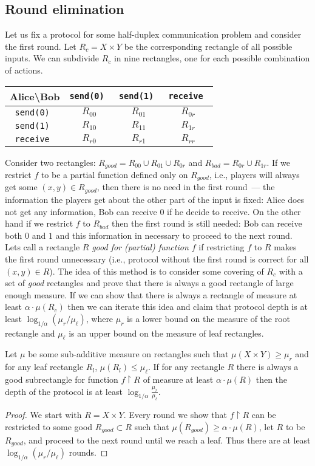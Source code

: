 \subsection{Round elimination}
Let us fix a protocol for some half-duplex communication problem and consider the first round. Let $R_c = X\times Y$ be the corresponding rectangle of all possible inputs.
We can subdivide $R_c$ in nine rectangles, one for each possible combination of actions.
\begin{center}
\begin{tabular}{c|c|c|c}
\bf Alice\textbackslash Bob &  \tt send(0) & \tt send(1) &  \tt receive \\\hline 
\tt send(0)  & $R_{00}$ & $R_{01}$ & $R_{0r}$ \\\hline
\tt send(1)  & $R_{10}$ & $R_{11}$ & $R_{1r}$ \\\hline
\tt receive  & $R_{r0}$ & $R_{r1}$ & $R_{rr}$ 
\end{tabular}
\end{center}
Consider two rectangles: $R_{good} = R_{00} \cup R_{01} \cup R_{0r}$ and $R_{bad} = R_{0r}\cup
R_{1r}$. If we restrict $f$ to be a partial function defined 
only on $R_{good}$, i.e., players will always get some 
$(x,y)\in R_{good}$, then there is no need in the first round~---
the information the players get about the other part of the input is fixed: Alice does not get any
information, Bob can receive $0$ if he decide to receive. On the other hand if we restrict $f$ to $R_{bad}$ then the first round is still needed: Bob can receive both $0$ and $1$ and
this information in necessary to proceed to the next round. Lets call a rectangle $R$ \emph{good for (partial) function $f$} if restricting $f$ to $R$ makes the first round unnecessary (i.e., protocol without the first round is correct for all $(x,y)\in R$).
The idea of this method is to consider
some covering of $R_c$ with a set of \emph{good}
rectangles and prove that there is always a good rectangle of large enough measure.  If we can show
that there is always a rectangle of measure at least $\alpha\cdot\mu(R_c)$ then 
we can iterate this idea and claim that protocol depth is at least 
$\log_{1/\alpha}(\mu_r/\mu_\ell)$, where $\mu_r$ is a lower bound 
on the measure of the root rectangle and $\mu_\ell$ is an upper bound 
on the measure of leaf rectangles.

\begin{lemma}\label{lm:rect-elim}
Let $\mu$ be some sub-additive measure on rectangles such that $\mu(X\times Y) \ge \mu_r$ and for
any leaf rectangle $R_l$, $\mu(R_l)\le \mu_\ell$. If for any rectangle $R$ 
there is always a good subrectangle for function $f\restriction R$ of measure at least $\alpha\cdot \mu(R)$ then the depth of the protocol is at least $\log_{1/\alpha} \frac{\mu_r}{\mu_\ell}$.
\end{lemma}
\begin{proof}
We start with $R = X\times Y$. Every round we show that $f \restriction R$ can be restricted 
to some good $R_{good} \subset R$ such that
$\mu(R_{good})\ge \alpha\cdot \mu(R)$, let $R$ to be $R_{good}$, and proceed to the next round
until we reach a leaf. Thus there are at least $\log_{1/\alpha}(\mu_r/\mu_\ell)$ rounds.
\end{proof}

